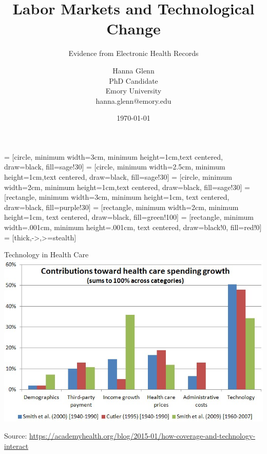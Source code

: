 \documentclass[notes,11pt, aspectratio=169]{beamer}
\title[]{\textcolor{sage}{Labor Markets and Technological Change}}
\subtitle[]{Evidence from Electronic Health Records}
\author[]{Hanna Glenn\\PhD Candidate\\Emory University\\hanna.glenn@emory.edu}
\date{\today}
\begin{document}
 = [circle, minimum width=3cm, minimum height=1cm,text centered, draw=black, fill=sage!30]
 = [circle, minimum width=2.5cm, minimum height=1cm,text centered, draw=black, fill=sage!30]
 = [circle, minimum width=2cm, minimum height=1cm,text centered, draw=black, fill=sage!30]
 = [rectangle, minimum width=3cm, minimum height=1cm, text centered, draw=black, fill=purple!30]
 = [rectangle, minimum width=2cm, minimum height=1cm, text centered, draw=black, fill=green!100]
 = [rectangle, minimum width=.001cm, minimum height=.001cm, text centered, draw=black!0, fill=red!0]
 = [thick,->,>=stealth]

\begin{frame}
\maketitle
\end{frame}

\begin{frame}{Technology in Health Care}
    \centering
    \includegraphics[scale=.4]{Objects/tech_graphic.jpg}
    
    \tiny{Source: \hyperlink{https://academyhealth.org/blog/2015-01/how-coverage-and-technology-interact}{https://academyhealth.org/blog/2015-01/how-coverage-and-technology-interact}}
    
\end{frame}
\end{document}
